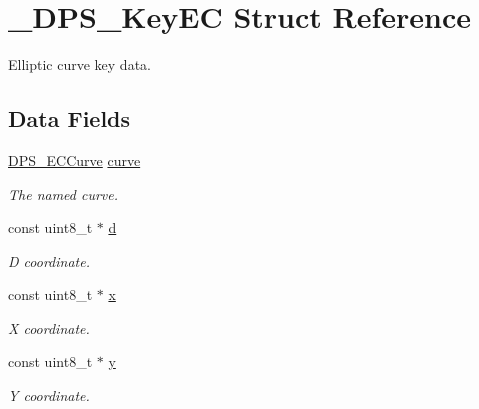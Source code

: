 \hypertarget{struct___d_p_s___key_e_c}{}\section{\+\_\+\+D\+P\+S\+\_\+\+Key\+EC Struct Reference}
\label{struct___d_p_s___key_e_c}


Elliptic curve key data.  


\subsection*{Data Fields}
\begin{DoxyCompactItemize}
\item 
\mbox{\label{struct___d_p_s___key_e_c_a9896c40cd0b6dd0bd05ac5831fc421d9}} 
\hyperlink{group__keystore_ga9ba152af7a3ed9076bfa597ef918cac1}{D\+P\+S\+\_\+\+E\+C\+Curve} \hyperlink{struct___d_p_s___key_e_c_a9896c40cd0b6dd0bd05ac5831fc421d9}{curve}
\begin{DoxyCompactList}\small\item\em The named curve. \end{DoxyCompactList}\item 
\mbox{\label{struct___d_p_s___key_e_c_aa008a9db4f8bc93e6572b91cfb0a51dd}} 
const uint8\+\_\+t $\ast$ \hyperlink{struct___d_p_s___key_e_c_aa008a9db4f8bc93e6572b91cfb0a51dd}{d}
\begin{DoxyCompactList}\small\item\em D coordinate. \end{DoxyCompactList}\item 
\mbox{\label{struct___d_p_s___key_e_c_a341a17a83bec9eb91bc2ce93c3832d81}} 
const uint8\+\_\+t $\ast$ \hyperlink{struct___d_p_s___key_e_c_a341a17a83bec9eb91bc2ce93c3832d81}{x}
\begin{DoxyCompactList}\small\item\em X coordinate. \end{DoxyCompactList}\item 
\mbox{\label{struct___d_p_s___key_e_c_adab7230a279ab8e4a30483cc71608abd}} 
const uint8\+\_\+t $\ast$ \hyperlink{struct___d_p_s___key_e_c_adab7230a279ab8e4a30483cc71608abd}{y}
\begin{DoxyCompactList}\small\item\em Y coordinate. \end{DoxyCompactList}\end{DoxyCompactItemize}


